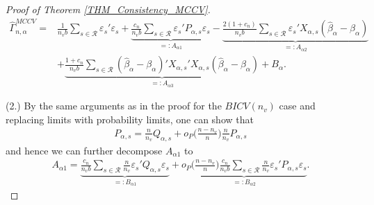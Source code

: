 \documentclass[Research_Module_ES.tex]{subfiles}
\begin{document}
\begin{proof}[Proof of Theorem \ref{THM_Consistency_MCCV}]
	\begin{align*}
	\hat{\Gamma}_{n,\alpha}^{MCCV} 
	= &\frac{1}{n_vb}\sum_{s\in \mathcal{R}}\varepsilon_s'\varepsilon_s 
	+ \underbrace{\frac{c_n}{n_vb}\sum_{s\in \mathcal{R}}\varepsilon_s'P_{\alpha,s}\varepsilon_s}_{=:A_{\alpha1}}
	- \underbrace{\frac{2(1+c_n)}{n_vb}\sum_{s\in \mathcal{R}}\varepsilon_s'X_{\alpha,s}(\hat{\beta}_\alpha-\beta_\alpha)}_{=:A_{\alpha2}}\\
	&+ \underbrace{\frac{1+c_n}{n_vb}\sum_{s\in \mathcal{R}}(\hat{\beta}_\alpha-\beta_\alpha)'X_{\alpha,s}'X_{\alpha,s}(\hat{\beta}_\alpha-\beta_\alpha)}_{=:A_{\alpha3}} + B_{\alpha}.
	\end{align*}
	
	(2.)
	By the same arguments as in the proof for the $BICV(n_v)$ case and replacing limits with probability limits, one can show that
	\begin{align*}
	P_{\alpha,s}=\frac{n}{n_v}Q_{\alpha,s}+o_P\biggl(\frac{n-n_v}{n}\biggr)\frac{n}{n_v}P_{\alpha,s}
	\end{align*}
	and hence we can further decompose $A_{\alpha1}$ to
	\begin{align*}
	A_{\alpha1}= \underbrace{\frac{c_n}{n_vb}\sum_{s\in\mathcal{R}}\frac{n}{n_v}\varepsilon_s'Q_{\alpha,s}\varepsilon_s}_{=:B_{\alpha1}}
	+ \underbrace{o_P\biggl(\frac{n-n_v}{n}\biggr)\frac{c_n}{n_vb}\sum_{s\in\mathcal{R}}\frac{n}{n_v}\varepsilon_s'P_{\alpha,s}\varepsilon_s}_{=:B_{\alpha2}}.
	\end{align*}
	

\end{proof}
\end{document}
